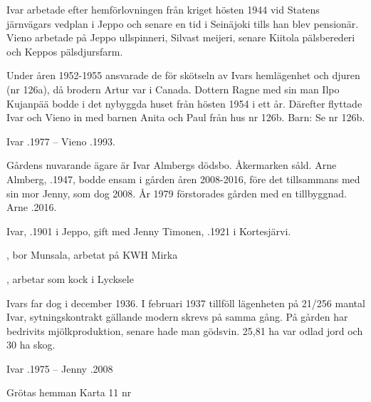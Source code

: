 Ivar arbetade efter hemförlovningen från kriget hösten  1944 vid Statens järnvägars vedplan i Jeppo och senare en tid i Seinäjoki tills han blev pensionär. Vieno arbetade på Jeppo ullspinneri, Silvast meijeri, senare Kiitola pälsberederi och Keppos pälsdjursfarm.

Under åren 1952-1955 ansvarade de för skötseln av Ivars hemlägenhet och djuren (nr 126a), då brodern Artur var i Canada. Dottern Ragne med sin man Ilpo Kujanpää bodde i det nybyggda huset från hösten 1954 i ett år. Därefter flyttade Ivar och Vieno in med barnen Anita och Paul från hus nr 126b. Barn: Se nr 126b.

Ivar .1977  --  Vieno .1993.




Gårdens nuvarande ägare är Ivar Almbergs dödsbo. Åkermarken såld. Arne Almberg, .1947, bodde ensam i gården åren 2008-2016, före det tillsammans med sin mor Jenny, som dog 2008. År 1979 förstorades gården med en tillbyggnad. Arne .2016.


Ivar, .1901 i Jeppo, gift med Jenny Timonen, .1921 i Kortesjärvi.
\begin{jhchildren}
  \item {}, bor Munsala, arbetat på KWH Mirka
  \item {}
  \item {}
  \item {}, arbetar som kock i Lycksele
\end{jhchildren}
Ivars far dog i december 1936. I februari 1937 tillföll lägenheten på 21/256 mantal Ivar, sytningskontrakt gällande modern skrevs på samma gång. På gården har bedrivits mjölkproduktion, senare hade man gödsvin. 25,81 ha var odlad jord och 30 ha skog.

Ivar .1975  --  Jenny .2008



 		Grötas hemman 	Karta 11     nr 


